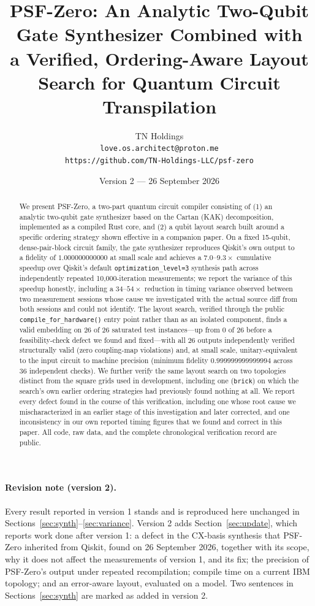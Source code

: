 \documentclass[11pt]{article}
\title{PSF-Zero: An Analytic Two-Qubit Gate Synthesizer Combined with\\
a Verified, Ordering-Aware Layout Search for Quantum Circuit\\
Transpilation}
\author{TN Holdings\\
\texttt{love.os.architect@proton.me}\\
\texttt{https://github.com/TN-Holdings-LLC/psf-zero}}
\date{Version 2 --- 26 September 2026}
\begin{document}
\maketitle

\begin{abstract}
We present PSF-Zero, a two-part quantum circuit compiler consisting of
(1) an analytic two-qubit gate synthesizer based on the Cartan (KAK)
decomposition, implemented as a compiled Rust core, and (2) a qubit
layout search built around a specific ordering strategy shown effective
in a companion paper. On a fixed 15-qubit, dense-pair-block circuit
family, the gate synthesizer reproduces Qiskit's own output to a
fidelity of $1.000000000000$ at small scale and achieves a
$7.0$--$9.3\times$ cumulative speedup over Qiskit's default
\texttt{optimization\_level=3} synthesis path across independently
repeated 10,000-iteration measurements; we report the variance of this
speedup honestly, including a $34$--$54\times$ reduction in timing
variance observed between two measurement sessions whose cause we
investigated with the actual source diff from both sessions and could
not identify. The layout search, verified through the public
\texttt{compile\_for\_hardware()} entry point rather than as an isolated
component, finds a valid embedding on 26 of 26 saturated test
instances---up from 0 of 26 before a feasibility-check defect we found
and fixed---with all 26 outputs independently verified structurally
valid (zero coupling-map violations) and, at small scale,
unitary-equivalent to the input circuit to machine precision (minimum
fidelity $0.999999999999994$ across 36 independent checks). We further
verify the same layout search on two topologies distinct from the
square grids used in development, including one (\texttt{brick}) on
which the search's own earlier ordering strategies had previously found
nothing at all. We report every defect found in the course of this
verification, including one whose root cause we mischaracterized in an
earlier stage of this investigation and later corrected, and one
inconsistency in our own reported timing figures that we found and
correct in this paper. All code, raw data, and the complete
chronological verification record are public.
\end{abstract}

\paragraph{Revision note (version 2).} Every result reported in version 1
stands and is reproduced here unchanged in Sections~\ref{sec:synth}--\ref{sec:variance}.
Version 2 adds Section~\ref{sec:update}, which reports work done after
version 1: a defect in the CX-basis synthesis that PSF-Zero inherited from
Qiskit, found on 26 September 2026, together with its scope, why it does
not affect the measurements of version 1, and its fix; the precision of
PSF-Zero's output under repeated recompilation; compile time on a current
IBM topology; and an error-aware layout, evaluated on a model. Two
sentences in Sections~\ref{sec:synth} are marked as added in version 2.
\end{document}
